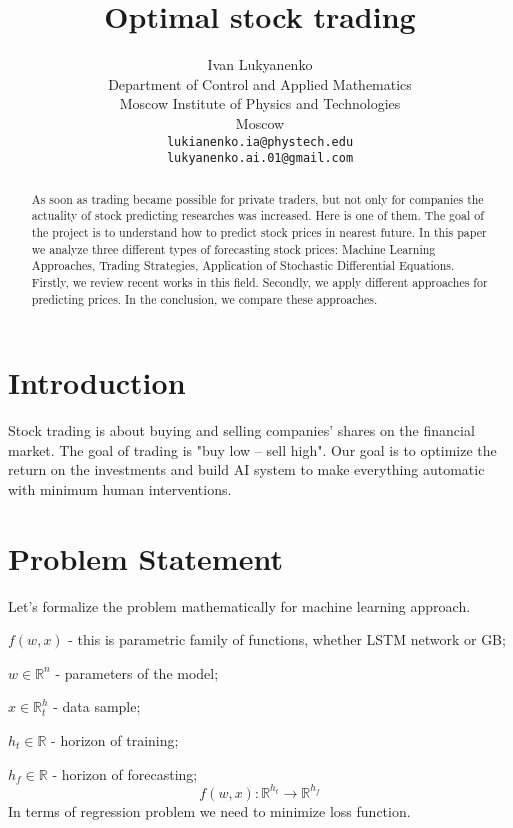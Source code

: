 \documentclass{article}
\title{Optimal stock trading}
\author{ Ivan Lukyanenko \\
	Department of Control and Applied Mathematics\\
	Moscow Institute of Physics and Technologies\\
	Moscow \\
	\texttt{lukianenko.ia@phystech.edu} \\
	\texttt{lukyanenko.ai.01@gmail.com} \\
}
\date{}
\begin{document}
\maketitle

\begin{abstract}
    As soon as trading became possible for private traders, but not only for companies the actuality of stock predicting researches was increased. Here is one of them. The goal of the project is to understand how to predict stock prices in nearest future. In this paper we analyze three different types of forecasting stock prices: Machine Learning Approaches, Trading Strategies, Application of Stochastic Differential Equations. Firstly, we review recent works in this field. Secondly, we apply different approaches for predicting prices. In the conclusion, we compare these approaches. 
\end{abstract}


\section{Introduction}
    Stock trading is about buying and selling companies' shares on the financial market. The goal of trading is  "buy low -- sell high". Our goal is to optimize the return on the investments and build AI system to make everything automatic with minimum human interventions.   
\section{Problem Statement}
    Let's formalize the problem mathematically for machine learning approach.
    
    $f(w, x)$ - this is parametric family of functions, whether LSTM network or GB;
    
    $w \in \mathbb{R} ^ n$ - parameters of the model;
    
    $x \in \mathbb{R} ^ h_t$ - data sample;
    
    $h_t \in \mathbb{R}$ - horizon of training;
    
    $h_f \in \mathbb{R}$ - horizon of forecasting;
    \begin{equation}
        f(w, x) : \mathbb{R}^{h_t} \rightarrow \mathbb{R}^{h_f} 
    \end{equation}
    In terms of regression problem we need to minimize loss function.
    
\end{document}
